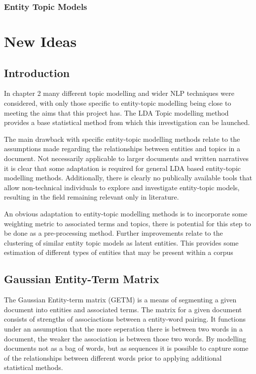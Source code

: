 \documentclass[10pt]{report}
\begin{document}
\subsection{Entity Topic Models}



%
%
%
%
\chapter{New Ideas}
\section{Introduction}
In chapter 2 many different topic modelling and wider NLP techniques were considered, with only those specific to entity-topic modelling being close to meeting the aims that this project has. The LDA Topic modelling method provides a base statistical method from which this investigation can be launched.

The main drawback with specific entity-topic modelling methods relate to the assumptions made regarding the relationships between entities and topics in a document. Not necessarily applicable to larger documents and written narratives it is clear that some adaptation is required for general LDA based entity-topic modelling methods. Additionally, there is clearly no publically available tools that allow non-technical individuals to explore and investigate entity-topic models, resulting in the field remaining relevant only in literature.

An obvious adaptation to entity-topic modelling methods is to incorporate some weighting metric to associated terms and topics, there is potential for this step to be done as a pre-processing method. Further improvements relate to the clustering of similar entity topic models as latent entities. This provides some estimation of different types of entities that may be present within a corpus


\section{Gaussian Entity-Term Matrix}

The Gaussian Entity-term matrix (GETM) is a means of segmenting a given document into entities and associated terms. The matrix for a given document consists of strengths of associactions between a entity-word pairing. It functions under an assumption that the more seperation there is between two words in a document, the weaker the association is between those two  words. By modelling documents not as a bag of words, but as sequences it is possible to capture some of the relationships between different words prior to applying additional statistical methods.
\end{document}

